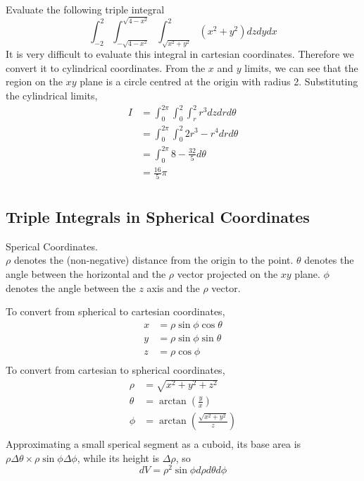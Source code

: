 \documentclass[12pt]{article}
\begin{document}
\begin{ex}
	Evaluate the following triple integral
	$$\int_{-2}^2 \int_{-\sqrt{4-x^2}}^{\sqrt{4-x^2}} \int_{\sqrt{x^2+y^2}}^2 (x^2+y^2)dzdydx$$
	It is very difficult to evaluate this integral in cartesian coordinates. Therefore we convert it to cylindrical coordinates. From the $x$ and $y$ limits, we can see that the region on the $xy$ plane is a circle centred at the origin with radius 2. Substituting the cylindrical limits,
	\begin{align*}
		I &= \int_0^{2\pi} \int_0^2 \int_r^2 r^3 dzdrd\theta \\
		  &= \int_0^{2\pi} \int_0^2 2r^3 - r^4 drd\theta \\
		  &= \int_0^{2\pi} 8 - \frac{32}{5} d\theta \\
		  &= \frac{16}{5}\pi \\
	\end{align*}
\end{ex}

\subsection{Triple Integrals in Spherical Coordinates}

\begin{defn}
	Sperical Coordinates. \\
	$\rho$ denotes the (non-negative) distance from the origin to the point. $\theta$ denotes the angle between the horizontal and the $\rho$ vector projected on the $xy$ plane. $\phi$ denotes the angle between the $z$ axis and the $\rho$ vector.
\end{defn}
To convert from spherical to cartesian coordinates,
\begin{align*}
	x &= \rho\sin\phi\cos\theta \\
	y &= \rho\sin\phi\sin\theta \\
	z &= \rho\cos\phi \\
\end{align*}
To convert from cartesian to spherical coordinates,
\begin{align*}
	\rho &= \sqrt{x^2+y^2+z^2} \\
	\theta &= \arctan\left(\frac{y}{x}\right) \\
	\phi &= \arctan\left(\frac{\sqrt{x^2+y^2}}{z}\right) \\
\end{align*}
Approximating a small sperical segment as a cuboid, its base area is $\rho\Delta\theta \times \rho\sin\phi\Delta\phi$, while its height is $\Delta \rho$, so
$$dV = \rho^2\sin\phi d\rho d\theta d\phi$$
\end{document}

